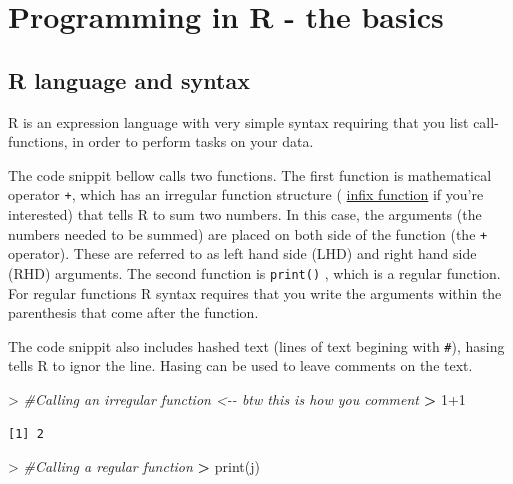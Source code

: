 \documentclass[
]{book}
\newenvironment{Shaded}{\begin{snugshade}}{\end{snugshade}}
\newcommand{\CommentTok}[1]{\textcolor[rgb]{0.56,0.35,0.01}{\textit{#1}}}
\newcommand{\DecValTok}[1]{\textcolor[rgb]{0.00,0.00,0.81}{#1}}
\newcommand{\ErrorTok}[1]{\textcolor[rgb]{0.64,0.00,0.00}{\textbf{#1}}}
\newcommand{\FunctionTok}[1]{\textcolor[rgb]{0.00,0.00,0.00}{#1}}
\newcommand{\NormalTok}[1]{#1}
\newcommand{\SpecialCharTok}[1]{\textcolor[rgb]{0.00,0.00,0.00}{#1}}
\theoremstyle{definition}
\theoremstyle{definition}
\theoremstyle{definition}
\theoremstyle{definition}
\theoremstyle{remark}
\begin{document}
\hypertarget{programming-in-r---the-basics}{%
\section*{\texorpdfstring{\textbf{Programming in R - the basics}}{Programming in R - the basics}}\label{programming-in-r---the-basics}}

\hypertarget{r-language-and-syntax}{%
\subsection*{\texorpdfstring{\textbf{R language and syntax}}{R language and syntax}}\label{r-language-and-syntax}}

R is an expression language with very simple syntax requiring that you list call-functions, in order to perform tasks
on your data.

The code snippit bellow calls two functions. The first function is mathematical operator \texttt{+}, which has an irregular
function structure ( \href{https://en.wikipedia.org/wiki/Infix_notation}{infix function} if you're interested) that tells
R to sum two numbers.
In this case, the arguments (the numbers needed to be summed) are placed on both side of the function (the \texttt{+} operator).
These are referred to as left hand side (LHD) and right hand side (RHD) arguments.
The second function is \texttt{print()} , which is a regular function. For regular functions R syntax
requires that you write the arguments within the parenthesis that come after the function.

The code snippit also includes hashed text (lines of text begining with \texttt{\#}), hasing tells R to ignor the line.
Hasing can be used to leave comments on the text.

\begin{Shaded}
\begin{Highlighting}[]
\SpecialCharTok{\textgreater{}} \CommentTok{\#Calling an irregular function \textless{}{-}{-} btw this is how you comment}
\ErrorTok{\textgreater{}} \DecValTok{1}\SpecialCharTok{+}\DecValTok{1}
\end{Highlighting}
\end{Shaded}

\begin{verbatim}
[1] 2
\end{verbatim}

\begin{Shaded}
\begin{Highlighting}[]
\SpecialCharTok{\textgreater{}} \CommentTok{\#Calling a regular function}
\ErrorTok{\textgreater{}} \FunctionTok{print}\NormalTok{(j)}
\end{Highlighting}
\end{Shaded}
\end{document}
